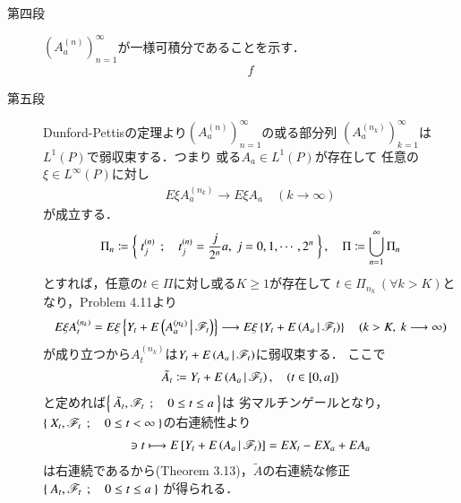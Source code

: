 \begin{prf}
\begin{description}
			\item[第四段]
				$\left( A^{(n)}_a \right)_{n=1}^\infty$が一様可積分であることを示す．
				\begin{align}
					f
				\end{align}
				
			\item[第五段]
				Dunford-Pettisの定理より$\left( A^{(n)}_a \right)_{n=1}^\infty$の或る部分列
				$\left( A^{(n_k)}_a \right)_{k=1}^\infty$は$L^1(P)$で弱収束する．つまり
				或る$A_a \in L^1(P)$が存在して
				任意の$\xi \in L^\infty(P)$に対し
				\begin{align}
					E \xi A^{(n_k)}_a \longrightarrow E \xi A_a
					\quad (k \longrightarrow \infty)
				\end{align}
				が成立する．
				\begin{align}
					\Pi_n \coloneqq \left\{\ t^{(n)}_j\ \, ; \quad t^{(n)}_j = \frac{j}{2^n}a,\ j=0,1,\cdots,2^n\ \right\},
					\quad \Pi \coloneqq \bigcup_{n=1}^\infty \Pi_n
				\end{align}
				とすれば，任意の$t \in \Pi$に対し或る$K \geq 1$が存在して
				$t \in \Pi_{n_k}\ (\forall k > K)$となり，Problem 4.11より
				\begin{align}
					E \xi A^{(n_k)}_t
					= E \xi\left\{ Y_t + E\left( A^{(n_k)}_a \, \middle|\, \mathscr{F}_t \right) \right\}
					\longrightarrow E \xi\left\{ Y_t + E\left( A_a \, \middle|\, \mathscr{F}_t \right) \right\}
					\quad (k > K,\ k \longrightarrow \infty)
				\end{align}
				が成り立つから$A^{(n_k)}_t$は$Y_t + E\left( A_a \, \middle|\, \mathscr{F}_t \right)$に弱収束する．
				ここで
				\begin{align}
					\tilde{A}_t \coloneqq Y_t + E\left( A_a \, \middle|\, \mathscr{F}_t \right),
					\quad (t \in [0,a])
				\end{align}
				と定めれば$\left\{\ \tilde{A}_t,\mathscr{F}_t\ \, ; \quad 0 \leq t \leq a\ \right\}$は
				劣マルチンゲールとなり，$\left\{\ X_t,\mathscr{F}_t\ \, ; \quad 0 \leq t <\infty\ \right\}$の右連続性より
				\begin{align}
					[0,a] \ni t \longmapsto E\left[ Y_t + \cexp{A_a}{\mathscr{F}_t} \right]
					= E X_t - E X_a + E A_a
				\end{align}
				は右連続であるから(Theorem 3.13)，$\tilde{A}$の右連続な修正$\left\{\ A_t,\mathscr{F}_t\ \, ; \quad 0 \leq t \leq a\ \right\}$
				が得られる．
			

\end{description}
\end{prf}
